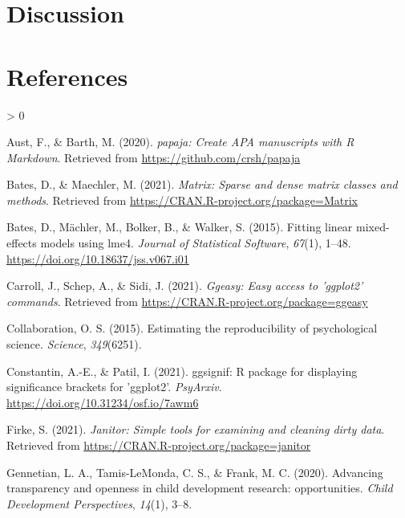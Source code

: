 \documentclass[
  english,
  man]{apa6}
\newlength{\cslhangindent}
\newenvironment{CSLReferences}[2] %
 {%
  \setlength{\parindent}{0pt}
  \ifodd #1 \everypar{\setlength{\hangindent}{\cslhangindent}}\ignorespaces\fi
  \ifnum #2 > 0
  \setlength{\parskip}{#2\baselineskip}
  \fi
 }%
 {}
\begin{document}
\hypertarget{discussion}{%
\section{Discussion}\label{discussion}}

\newpage

\hypertarget{references}{%
\section{References}\label{references}}

\begingroup
\setlength{\parindent}{-0.5in}
\setlength{\leftskip}{0.5in}

\hypertarget{refs}{}
\begin{CSLReferences}{1}{0}
\leavevmode\hypertarget{ref-R-papaja}{}%
Aust, F., \& Barth, M. (2020). \emph{{papaja}: {Create} {APA} manuscripts with {R Markdown}}. Retrieved from \url{https://github.com/crsh/papaja}

\leavevmode\hypertarget{ref-R-Matrix}{}%
Bates, D., \& Maechler, M. (2021). \emph{Matrix: Sparse and dense matrix classes and methods}. Retrieved from \url{https://CRAN.R-project.org/package=Matrix}

\leavevmode\hypertarget{ref-R-lme4}{}%
Bates, D., Mächler, M., Bolker, B., \& Walker, S. (2015). Fitting linear mixed-effects models using {lme4}. \emph{Journal of Statistical Software}, \emph{67}(1), 1--48. \url{https://doi.org/10.18637/jss.v067.i01}

\leavevmode\hypertarget{ref-R-ggeasy}{}%
Carroll, J., Schep, A., \& Sidi, J. (2021). \emph{Ggeasy: Easy access to 'ggplot2' commands}. Retrieved from \url{https://CRAN.R-project.org/package=ggeasy}

\leavevmode\hypertarget{ref-open2015estimating}{}%
Collaboration, O. S. (2015). Estimating the reproducibility of psychological science. \emph{Science}, \emph{349}(6251).

\leavevmode\hypertarget{ref-R-ggsignif}{}%
Constantin, A.-E., \& Patil, I. (2021). {ggsignif}: R package for displaying significance brackets for {'ggplot2'}. \emph{PsyArxiv}. \url{https://doi.org/10.31234/osf.io/7awm6}

\leavevmode\hypertarget{ref-R-janitor}{}%
Firke, S. (2021). \emph{Janitor: Simple tools for examining and cleaning dirty data}. Retrieved from \url{https://CRAN.R-project.org/package=janitor}

\leavevmode\hypertarget{ref-gennetian2020advancing}{}%
Gennetian, L. A., Tamis-LeMonda, C. S., \& Frank, M. C. (2020). Advancing transparency and openness in child development research: opportunities. \emph{Child Development Perspectives}, \emph{14}(1), 3--8.


\end{CSLReferences}
\end{document}
